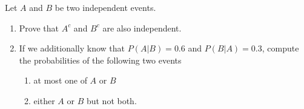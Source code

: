 
\begin{exercise}[Independence]

Let $A$ and $B$ be two independent events.

\begin{enumerate}[label = (\alph*)]

    \item Prove that $A^c$ and $B^c$ are also independent.

    \item If we additionally know that $P(A | B) = 0.6$ and $P(B | A) = 0.3$, compute the probabilities of the following two events

    \begin{enumerate}[label = (\roman*)]
        \item at most one of $A$ or $B$
        \item either $A$ or $B$ but not both.
    \end{enumerate}

\end{enumerate}

\end{exercise}


